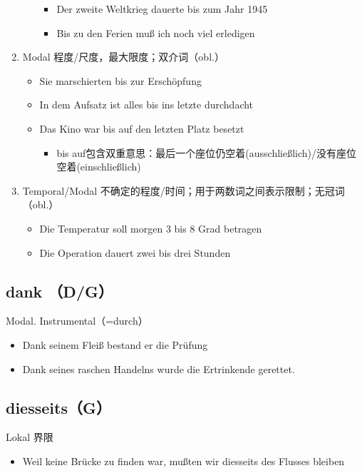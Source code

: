 \documentclass[UTF8]{report}
\begin{document}
\begin{enumerate}
\begin{enumerate}
\begin{itemize}
            \item Der zweite Weltkrieg dauerte bis zum Jahr 1945
            \item Bis zu den Ferien muß ich noch viel erledigen
        \end{itemize}
    \end{enumerate}
    \item Modal 程度/尺度，最大限度；双介词（obl.）
    \begin{itemize}
        \item Sie marschierten bis zur Erschöpfung
        \item In dem Aufsatz ist alles bis ins letzte durchdacht
        \item Das Kino war bis auf den letzten Platz besetzt
        \begin{itemize}
            \item bis auf包含双重意思：最后一个座位仍空着(ausschließlich)/没有座位空着(einschließlich)
        \end{itemize}
    \end{itemize}
    \item Temporal/Modal 不确定的程度/时间；用于两数词之间表示限制；无冠词（obl.）
    \begin{itemize}
        \item Die Temperatur soll morgen 3 bis 8 Grad betragen
        \item Die Operation dauert zwei bis drei Stunden
    \end{itemize}
\end{enumerate}
\subsection{dank （D/G）}
Modal. Instrumental（=durch）
\begin{itemize}
    \item Dank seinem Fleiß bestand er die Prüfung
    \item Dank seines raschen Handelns wurde die Ertrinkende gerettet.
\end{itemize}
\subsection{diesseits（G）}
Lokal 界限
\begin{itemize}
    \item Weil keine Brücke zu finden war, mußten wir diesseits des Flusses bleiben
\end{itemize}
\end{document}
